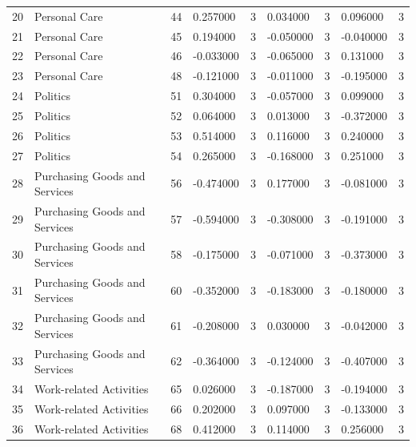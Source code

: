 \begin{tabular}{lllllllll}
20 & Personal Care & 44 & 0.257000 & 3 & 0.034000 & 3 & 0.096000 & 3 \\
21 & Personal Care & 45 & 0.194000 & 3 & -0.050000 & 3 & -0.040000 & 3 \\
22 & Personal Care & 46 & -0.033000 & 3 & -0.065000 & 3 & 0.131000 & 3 \\
23 & Personal Care & 48 & -0.121000 & 3 & -0.011000 & 3 & -0.195000 & 3 \\
24 & Politics & 51 & 0.304000 & 3 & -0.057000 & 3 & 0.099000 & 3 \\
25 & Politics & 52 & 0.064000 & 3 & 0.013000 & 3 & -0.372000 & 3 \\
26 & Politics & 53 & 0.514000 & 3 & 0.116000 & 3 & 0.240000 & 3 \\
27 & Politics & 54 & 0.265000 & 3 & -0.168000 & 3 & 0.251000 & 3 \\
28 & Purchasing Goods and Services & 56 & -0.474000 & 3 & 0.177000 & 3 & -0.081000 & 3 \\
29 & Purchasing Goods and Services & 57 & -0.594000 & 3 & -0.308000 & 3 & -0.191000 & 3 \\
30 & Purchasing Goods and Services & 58 & -0.175000 & 3 & -0.071000 & 3 & -0.373000 & 3 \\
31 & Purchasing Goods and Services & 60 & -0.352000 & 3 & -0.183000 & 3 & -0.180000 & 3 \\
32 & Purchasing Goods and Services & 61 & -0.208000 & 3 & 0.030000 & 3 & -0.042000 & 3 \\
33 & Purchasing Goods and Services & 62 & -0.364000 & 3 & -0.124000 & 3 & -0.407000 & 3 \\
34 & Work-related Activities & 65 & 0.026000 & 3 & -0.187000 & 3 & -0.194000 & 3 \\
35 & Work-related Activities & 66 & 0.202000 & 3 & 0.097000 & 3 & -0.133000 & 3 \\
36 & Work-related Activities & 68 & 0.412000 & 3 & 0.114000 & 3 & 0.256000 & 3 \\
\bottomrule
\end{tabular}
